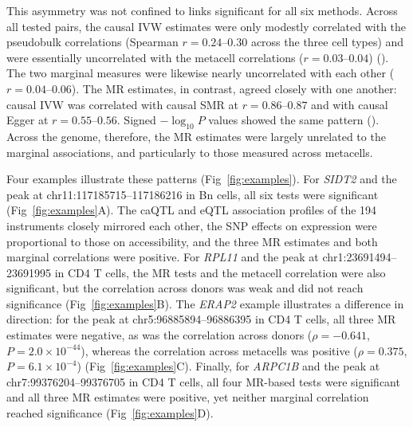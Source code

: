 \noindent This asymmetry was not confined to links significant for all six methods. Across all tested pairs, the causal IVW estimates were only modestly correlated with the pseudobulk correlations (Spearman \(r=0.24\)--\(0.30\) across the three cell types) and were essentially uncorrelated with the metacell correlations (\(r=0.03\)--\(0.04\)) (). The two marginal measures were likewise nearly uncorrelated with each other (\(r=0.04\)--\(0.06\)). The MR estimates, in contrast, agreed closely with one another: causal IVW was correlated with causal SMR at \(r=0.86\)--\(0.87\) and with causal Egger at \(r=0.55\)--\(0.56\). Signed \(-\log_{10}P\) values showed the same pattern (). Across the genome, therefore, the MR estimates were largely unrelated to the marginal associations, and particularly to those measured across metacells.

\noindent Four examples illustrate these patterns (Fig~\ref{fig:examples}). For \textit{SIDT2} and the peak at chr11:117185715--117186216 in Bn cells, all six tests were significant (Fig~\ref{fig:examples}A). The caQTL and eQTL association profiles of the 194 instruments closely mirrored each other, the SNP effects on expression were proportional to those on accessibility, and the three MR estimates and both marginal correlations were positive. For \textit{RPL11} and the peak at chr1:23691494--23691995 in CD4 T cells, the MR tests and the metacell correlation were also significant, but the correlation across donors was weak and did not reach significance (Fig~\ref{fig:examples}B). The \textit{ERAP2} example illustrates a difference in direction: for the peak at chr5:96885894--96886395 in CD4 T cells, all three MR estimates were negative, as was the correlation across donors (\(\rho=-0.641\), \(P=2.0\times10^{-44}\)), whereas the correlation across metacells was positive (\(\rho=0.375\), \(P=6.1\times10^{-4}\)) (Fig~\ref{fig:examples}C). Finally, for \textit{ARPC1B} and the peak at chr7:99376204--99376705 in CD4 T cells, all four MR-based tests were significant and all three MR estimates were positive, yet neither marginal correlation reached significance (Fig~\ref{fig:examples}D).

